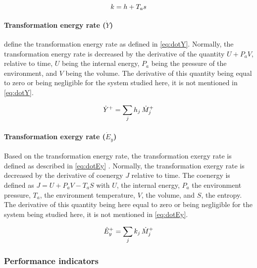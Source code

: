 \begin{equation}
  \label{eq:k}
  k = h + T_as
  \tagaddtextone{$\left[\si{\joule\per\kilo\gram}\right]$}
\end{equation}

\paragraph{Transformation energy rate ($\dot{Y}$)}

\citet[p.\,24]{Borel-Favrat-2010a} define the transformation energy
rate as defined in \cref{eq:dotY}. Normally, the transformation energy
rate is decreased by the derivative of the quantity $U + P_aV$,
relative to time, $U$ being the internal energy, $P_a$ being the
pressure of the environment, and $V$ being the volume. The derivative
of this quantity being equal to zero or being negligible for the
system studied here, it is not mentioned in \cref{eq:dotY}.

\begin{equation}
  \label{eq:dotY}
  \dot{Y}^{+} = \sum_{j} h_j \, \dot{M}_j^{+}
  \tagaddtextone{$\left[\si{\watt}\right]$}
\end{equation}

\paragraph{Transformation exergy rate ($\dot{E}_{y}$)}

Based on the transformation energy rate, the transformation exergy
rate is defined as described in \cref{eq:dotEy}
\citep[p.\,410]{Borel-Favrat-2010a}. Normally, the transformation
exergy rate is decreased by the derivative of coenergy $J$ relative to
time. The coenergy is defined as $J = U + P_aV-T_aS$ with $U$, the
internal energy, $P_a$ the environment pressure, $T_a$, the
environment temperature, $V$, the volume, and $S$, the entropy. The
derivative of this quantity being here equal to zero or being
negligible for the system being studied here, it is not mentioned in
\cref{eq:dotEy}.

\begin{equation}
  \label{eq:dotEy}
  \dot{E}_{y}^{+} = \sum_{j} k_j \, \dot{M}_j^{+}
  \tagaddtextone{$\left[\si{\watt}\right]$}
\end{equation}

\subsubsection{Performance indicators}
\label{sec:methodo-indicators}


